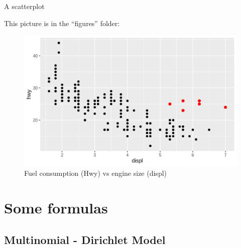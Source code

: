 
\begin{frame}{A scatterplot}

This picture is in the ``figures'' folder:

\begin{figure}
\includegraphics[scale=.5]{figures/outl.png}
\caption{Fuel consumption (Hwy) vs engine size (displ)}
\end{figure}

\end{frame}

\section{Some formulas}

\subsection{Multinomial - Dirichlet Model}


